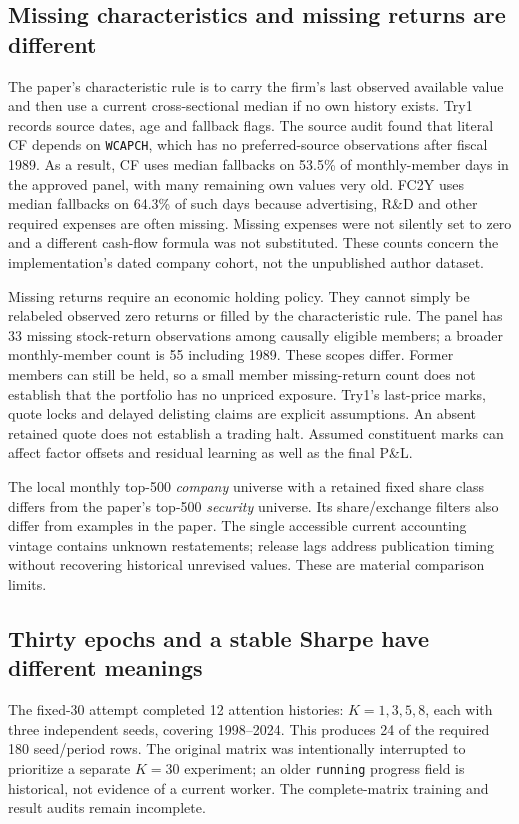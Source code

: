 \documentclass[11pt]{article}
\begin{document}
\subsection{Missing characteristics and missing returns are different}

The paper's characteristic rule is to carry the firm's last observed
available value and then use a current cross-sectional median if no own
history exists. Try1 records source dates, age and fallback flags. The
source audit found that literal CF depends on \texttt{WCAPCH}, which has
no preferred-source observations after fiscal 1989. As a result, CF uses
median fallbacks on 53.5\% of monthly-member days in the approved panel,
with many remaining own values very old. FC2Y uses median fallbacks on
64.3\% of such days because advertising, R\&D and other required expenses
are often missing. Missing expenses were not silently set to zero and a
different cash-flow formula was not substituted. These counts concern
the implementation's dated company cohort, not the unpublished author
dataset.

Missing returns require an economic holding policy. They cannot simply
be relabeled observed zero returns or filled by the characteristic rule.
The panel has 33 missing stock-return observations among causally
eligible members; a broader monthly-member count is 55 including 1989.
These scopes differ. Former members can still be held, so a small member
missing-return count does not establish that the portfolio has no
unpriced exposure. Try1's last-price marks, quote locks and delayed
delisting claims are explicit assumptions. An absent retained quote
does not establish a trading halt. Assumed constituent marks can affect
factor offsets and residual learning as well as the final P\&L.

The local monthly top-500 \emph{company} universe with a retained fixed
share class differs from the paper's top-500 \emph{security} universe.
Its share/exchange filters also differ from examples in the paper. The
single accessible current accounting vintage contains unknown
restatements; release lags address publication timing without recovering
historical unrevised values. These are material comparison limits.

\subsection{Thirty epochs and a stable Sharpe have different meanings}

The fixed-30 attempt completed 12 attention histories: $K=1,3,5,8$, each
with three independent seeds, covering 1998--2024. This produces 24 of
the required 180 seed/period rows. The original matrix was intentionally
interrupted to prioritize a separate $K=30$ experiment; an older
\texttt{running} progress field is historical, not evidence of a current
worker. The complete-matrix training and result audits remain incomplete.
\end{document}
